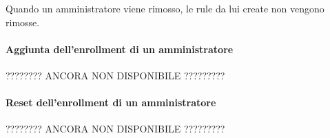 Quando un amministratore viene rimosso, le rule da lui create non vengono rimosse.
\paragraph{Aggiunta dell'enrollment di un amministratore}\label{addEnrollment}
???????? ANCORA NON DISPONIBILE ?????????
\paragraph{Reset dell'enrollment di un amministratore}
???????? ANCORA NON DISPONIBILE ?????????